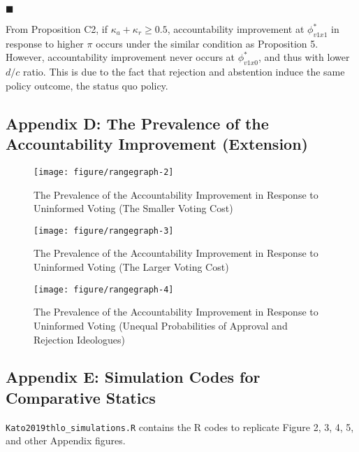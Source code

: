 \hfill $\blacksquare$

\par From Proposition C2, if $\kappa_a + \kappa_r \geq 0.5$, accountability improvement at $\phi^*_{v1x1}$ in response to higher $\pi$ occurs under the similar condition as Proposition 5. However, accountability improvement never occurs at $\phi^*_{v1x0}$, and thus with lower $d/c$ ratio. This is due to the fact that rejection and abstention induce the same policy outcome, the status quo policy. 

\clearpage
\subsection{Appendix D: The Prevalence of the Accountability Improvement (Extension)}

\renewcommand{\thefigure}{A\arabic{figure}}
\setcounter{figure}{0}

\begin{figure}[ht!]
	\caption{The Prevalence of the Accountability Improvement in Response to Uninformed Voting (The Smaller Voting Cost)}
	\label{fig:rangegraph2}
	\texttt{[image: figure/rangegraph-2]}
\end{figure}

\begin{figure}[ht!]
	\caption{The Prevalence of the Accountability Improvement in Response to Uninformed Voting (The Larger Voting Cost)}
	\label{fig:rangegraph3}
	\texttt{[image: figure/rangegraph-3]}
\end{figure}

\begin{figure}[ht!]
	\caption{The Prevalence of the Accountability Improvement in Response to Uninformed Voting (Unequal Probabilities of Approval and Rejection Ideologues)}
	\label{fig:rangegraph4}
	\texttt{[image: figure/rangegraph-4]}
\end{figure}

\clearpage
\subsection{Appendix E: Simulation Codes for Comparative Statics}

\par \nolinkurl{Kato2019thlo_simulations.R} contains the R codes to replicate Figure 2, 3, 4, 5, and other Appendix figures. 


